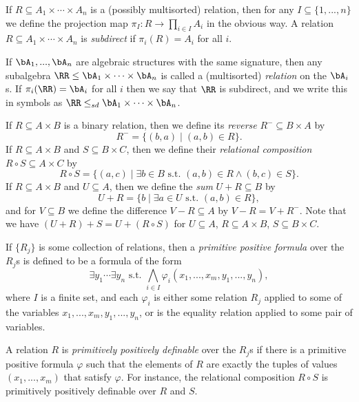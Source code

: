 \begin{defn} If $R \subseteq A_1 \times \cdots \times A_n$ is a (possibly multisorted) relation, then for any $I \subseteq \{1, ..., n\}$ we define the projection map $\pi_I : R \rightarrow \prod_{i \in I} A_i$ in the obvious way. A relation $R \subseteq A_1 \times \cdots \times A_n$ is \emph{subdirect} if $\pi_i(R) = A_i$ for all $i$.

If $\bA_1, ..., \bA_n$ are algebraic structures with the same signature, then any subalgebra $\RR \le \bA_1 \times \cdots \times \bA_n$ is called a (multisorted) \emph{relation} on the $\bA_i$s. If $\pi_i(\RR) = \bA_i$ for all $i$ then we say that $\RR$ is subdirect, and we write this in symbols as $\RR \le_{sd} \bA_1 \times \cdots \times \bA_n$.
\end{defn}

\begin{defn}
If $R \subseteq A \times B$ is a binary relation, then we define its \emph{reverse} $R^- \subseteq B\times A$ by
\[
R^- = \{(b,a) \mid (a,b) \in R\}.
\]
If $R \subseteq A \times B$ and $S \subseteq B \times C$, then we define their \emph{relational composition} $R\circ S \subseteq A\times C$ by
\[
R \circ S = \{(a,c) \mid \exists b\in B\text{ s.t. }(a,b) \in R \wedge (b,c) \in S\}.
\]
If $R \subseteq A \times B$ and $U \subseteq A$, then we define the \emph{sum} $U+R \subseteq B$ by
\[
U + R = \{b \mid \exists a \in U\text{ s.t. }(a,b)\in R\},
\]
and for $V \subseteq B$ we define the difference $V - R \subseteq A$ by $V - R = V + R^-$. Note that we have $(U + R) + S = U + (R \circ S)$ for $U \subseteq A$, $R \subseteq A \times B$, $S \subseteq B \times C$.
\end{defn}

\begin{defn} If $\{R_j\}$ is some collection of relations, then a \emph{primitive positive formula} over the $R_j$s is defined to be a formula of the form
\[
\exists y_1 \cdots \exists y_n\text{ s.t. }\bigwedge_{i \in I}\varphi_i(x_1, ..., x_m, y_1, ..., y_n),
\]
where $I$ is a finite set, and each $\varphi_i$ is either some relation $R_j$ applied to some of the variables $x_1, ..., x_m, y_1, ..., y_n$, or is the equality relation applied to some pair of variables.

A relation $R$ is \emph{primitively positively definable} over the $R_j$s if there is a primitive positive formula $\varphi$ such that the elements of $R$ are exactly the tuples of values $(x_1, ..., x_m)$ that satisfy $\varphi$. For instance, the relational composition $R \circ S$ is primitively positively definable over $R$ and $S$.
\end{defn}


